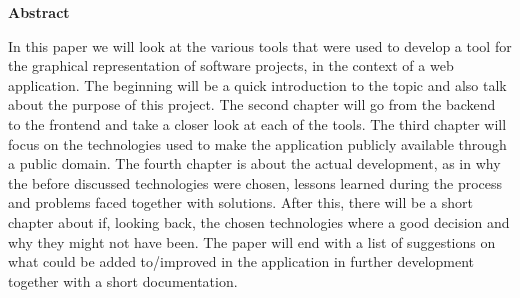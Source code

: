 \newpage

\vspace*{1cm}

\begin{center}
    \textbf{Abstract}
\end{center}

\vspace*{1cm}

\noindent
In this paper we will look at the various tools that were used to develop a tool for the graphical representation of software projects, in the context of a web application. The beginning will be a quick introduction to the topic and also talk about the purpose of this project. The second chapter will go from the backend to the frontend and take a closer look at each of the tools. The third chapter will focus on the technologies used to make the application publicly available through a public domain. The fourth chapter is about the actual development, as in why the before discussed technologies were chosen, lessons learned during the process and problems faced together with solutions. After this, there will be a short chapter about if, looking back, the chosen technologies where a good decision and why they might not have been. The paper will end with a list of suggestions on what could be added to/improved in the application in further development together with a short documentation.
